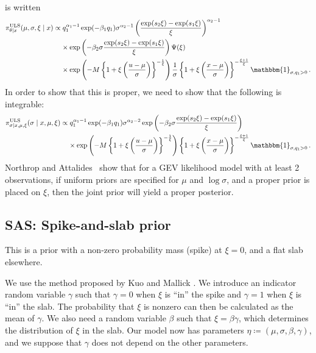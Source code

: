 \documentclass{article}
\begin{document}
%
is written
%
\begin{align*}
	\pi^{\text{ULS}}_{\theta\mid x}(\mu, \sigma, \xi \mid x)
&\propto q_{1} ^ {\alpha_1 - 1} \exp(-\beta_1 q_{1})
	\sigma ^ {\alpha_2 - 1} \left(\frac{\exp(s_{2} \xi)
	- \exp(s_{1} \xi)} {\xi}\right) ^ {\alpha_2 - 1}\\
&\ \phantom{=} \times \exp\left(-\beta_2 \sigma \frac{\exp(s_{2} \xi)
	- \exp(s_{1} \xi)}{\xi}\right) \Psi(\xi)\\
&\ \phantom{=} \times \exp \left(-M \left\{1 + \xi
	\left(\frac{u - \mu}{\sigma}\right)\right\} ^ {-\frac{1}{\xi}}\right)
	\frac{1}{\sigma}
	\left\{1 + \xi \left(\frac{x - \mu}{\sigma}\right)\right\}
	^ {-\frac{\xi + 1}{\xi}}
	\mathbbm{1}_{\sigma, q_1 > 0} \,.
\end{align*}
%
In order to show that this is proper,
we need to show that the following is integrable:
%
\begin{align*}
	\pi^{\text{ULS}}_{\sigma\mid x, \mu, \xi}(\sigma \mid x, \mu, \xi) &\propto
		q_{1} ^ {\alpha_1 - 1} \exp(-\beta_1 q_{1}) \sigma ^ {\alpha_2 - 2}
		\exp\left(-\beta_2 \sigma \frac{\exp(s_{2} \xi)
			- \exp(s_{1} \xi)}{\xi}\right) \\
	&\ \phantom{=} \times \exp \left(-M \left\{1 + \xi
		\left(\frac{u - \mu}{\sigma}\right)\right\} ^ {-\frac{1}{\xi}}\right)
		\left\{1 + \xi \left(\frac{x - \mu}{\sigma}\right)\right\}
		^ {-\frac{\xi + 1}{\xi}}
		\mathbbm{1}_{\sigma, q_1 > 0} \,.
\end{align*}
%
Northrop and Attalides~\cite{northrop2016} show that for a GEV likelihood model
with at least 2 observations,
if uniform priors are specified for $\mu$ and $\log \sigma$,
and a proper prior is placed on $\xi$,
then the joint prior will yield a proper posterior.
%
\subsection{SAS: Spike-and-slab prior}
%

%
This is a prior with a non-zero probability mass (spike) at $\xi = 0$,
and a flat slab elsewhere.
%

%
We use the method proposed by Kuo and Mallick \cite{kuo1998}.
We introduce an indicator random variable $\gamma$ such that
$\gamma = 0$ when $\xi$ is ``in'' the spike
and $\gamma = 1$ when $\xi$ is ``in'' the slab.
The probability that $\xi$ is nonzero can then be calculated
as the mean of $\gamma$.
We also need a random variable $\beta$ such that $\xi = \beta \gamma$,
which determines the distribution of $\xi$ in the slab.
Our model now has parameters $\eta \coloneqq (\mu, \sigma, \beta, \gamma)$,
and we suppose that $\gamma$ does not depend on the other parameters.
%
\end{document}
